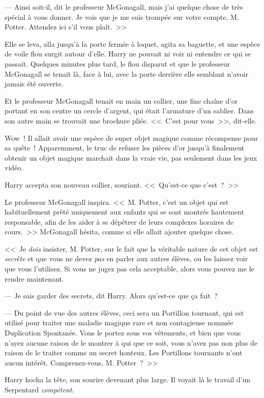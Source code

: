 --- Ainsi soit-il, dit le professeur McGonagall, mais j'ai quelque chose de très spécial à vous donner. Je vois que je me suis trompée sur votre compte, M. Potter. Attendez ici s'il vous plaît.~>>

Elle se leva, alla jusqu'à la porte fermée à loquet, agita sa baguette, et une espèce de voile flou surgit autour d'elle. Harry ne pouvait ni voir ni entendre ce qui se passait. Quelques minutes plus tard, le flou disparut et que le professeur McGonagall se tenait là, face à lui, avec la porte derrière elle semblant n'avoir jamais été ouverte.

Et le professeur McGonagall tenait en main un collier, une fine chaîne d'or portant en son centre un cercle d'argent, qui était l'armature d'un sablier. Dans son autre main se trouvait une brochure pliée. <<~C'est pour vous~>>, dit-elle.

Wow~! Il allait avoir une espèce de super objet magique comme récompense pour sa quête~! Apparemment, le truc de refuser les pièces d'or jusqu'à finalement obtenir un objet magique marchait dans la vraie vie, pas seulement dans les jeux vidéo.

Harry accepta son nouveau collier, souriant. <<~Qu'est-ce que c'est~?~>>

Le professeur McGonagall inspira. <<~M. Potter, c'est un objet qui est habituellement prêté uniquement aux enfants qui se sont montrés hautement responsable, afin de les aider à se dépêtrer de leurs complexes horaires de cours.~>> McGonagall hésita, comme si elle allait ajouter quelque chose.

<<~Je \emph{dois} insister, M. Potter, sur le fait que la véritable nature de cet objet est \emph{secrète} et que vous ne devez \emph{pas} en parler aux autres élèves, ou les laissez voir que vous l'utilisez. Si vous ne jugez pas cela acceptable, alors vous pouvez me le rendre maintenant.

--- Je sais garder des secrets, dit Harry. Alors qu'est-ce que ça fait~?

--- Du point de vue des autres élèves, ceci sera un Portillon tournant, qui est utilisé pour traiter une maladie magique rare et non contagieuse nommée Duplication Spontanée. Vous le portez sous vos vêtements, et bien que vous n'ayez aucune raison de le montrer à qui que ce soit, vous n'avez pas non plus de raison de le traiter comme un secret honteux. Les Portillons tournants n'ont aucun intérêt. Comprenez-vous, M. Potter~?~>>

Harry hocha la tête, son sourire devenant plus large. Il voyait là le travail d'un Serpentard \emph{compétent}.

